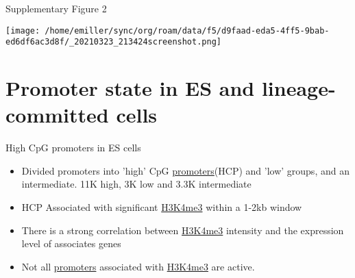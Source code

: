 \documentclass[bigger]{beamer}
\begin{document}
\begin{frame}[label={sec:orgc520755}]{Supplementary Figure 2}
\begin{center}
\texttt{[image: /home/emiller/sync/org/roam/data/f5/d9faad-eda5-4ff5-9bab-ed6df6ac3d8f/\_20210323\_213424screenshot.png]}
\end{center}
\end{frame}

\section{Promoter state in ES and lineage-committed cells}
\label{sec:orgea3e35f}
\begin{frame}[label={sec:orgaadc469}]{High CpG promoters in ES cells}
\begin{itemize}
\item Divided promoters into 'high' CpG \href{../../concepts/biology/promoter.org}{promoters}(HCP) and 'low' groups, and an
intermediate. 11K high, 3K low and 3.3K intermediate
\end{itemize}
\begin{itemize}
\item HCP Associated with significant \href{../../concepts/biology/h3k4me3.org}{H3K4me3} within a 1-2kb window
\item There is a strong correlation between \href{../../concepts/biology/h3k4me3.org}{H3K4me3} intensity and the expression level of associates genes
\item Not all \href{../../concepts/biology/promoter.org}{promoters} associated with \href{../../concepts/biology/h3k4me3.org}{H3K4me3} are active.
\end{itemize}
\end{frame}
\end{document}
